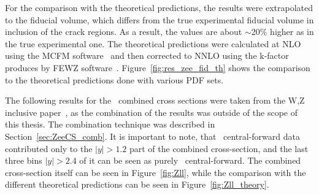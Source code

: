 For the comparison with the theoretical predictions, the results were extrapolated to the fiducial volume, which differs from the true experimental fiducial volume in inclusion of the crack regions. As a result, the values are about $\sim$20\% higher as in the true experimental one. The theoretical predictions were calculated at NLO using the MCFM software~\cite{lib:res_MCFM} and then corrected to NNLO using the k-factor produces by FEWZ software~\cite{lib:res_FEWZ1, lib:res_FEWZ2}. Figure~\ref{fig:res_zee_fid_th} shows the comparison to the theoretical predictions done with various PDF sets.

\begin{figure}
\end{figure}

The following results for the \Zll\ combined cross sections were taken from the W,Z inclusive paper~\cite{lib:wz2011}, as the combination of the results was outside of the scope of this thesis. The combination technique was described in Section~\ref{sec:ZeeCS_comb}. It is important to note, that \Zee\ central-forward data contributed only to the $|y| > 1.2$ part of the combined cross-section, and the last three bins $|y| > 2.4$ of it can be seen as purely \Zee\ central-forward. The combined cross-section itself can be seen in Figure~\ref{fig:Zll}, while the comparison with the different theoretical predictions can be seen in Figure~\ref{fig:Zll_theory}.

